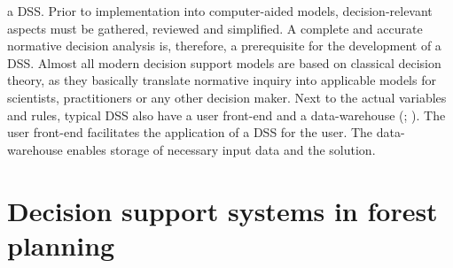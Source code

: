 a DSS. Prior to implementation into computer-aided models, decision-relevant aspects must be gathered, reviewed and simplified. A complete and accurate normative decision analysis is, therefore, a prerequisite for the development of a DSS. Almost all modern decision support models are based on classical decision theory, as they basically translate normative inquiry into applicable models for scientists, practitioners or any other decision maker. Next to the actual variables and rules, typical DSS also have a user front-end and a data-warehouse (\citealp[p. 2]{hansen_2012}; \citealp[p. 115]{shim_2002}). The user front-end facilitates the application of a DSS for the user. The data-warehouse enables storage of necessary input data and the solution.

\section{Decision support systems in forest planning}
\label{sec:intro:dss}
